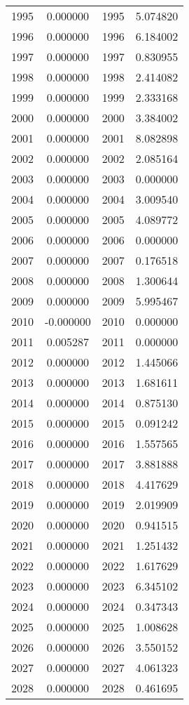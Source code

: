 \documentclass[12pt]{article}
\begin{document}
\begin{longtable}{@{}cccc@{}}
1995 & 0.000000 & 1995 & 5.074820 \\
1996 & 0.000000 & 1996 & 6.184002 \\
1997 & 0.000000 & 1997 & 0.830955 \\
1998 & 0.000000 & 1998 & 2.414082 \\
1999 & 0.000000 & 1999 & 2.333168 \\
2000 & 0.000000 & 2000 & 3.384002 \\
2001 & 0.000000 & 2001 & 8.082898 \\
2002 & 0.000000 & 2002 & 2.085164 \\
2003 & 0.000000 & 2003 & 0.000000 \\
2004 & 0.000000 & 2004 & 3.009540 \\
2005 & 0.000000 & 2005 & 4.089772 \\
2006 & 0.000000 & 2006 & 0.000000 \\
2007 & 0.000000 & 2007 & 0.176518 \\
2008 & 0.000000 & 2008 & 1.300644 \\
2009 & 0.000000 & 2009 & 5.995467 \\
2010 & -0.000000 & 2010 & 0.000000 \\
2011 & 0.005287 & 2011 & 0.000000 \\
2012 & 0.000000 & 2012 & 1.445066 \\
2013 & 0.000000 & 2013 & 1.681611 \\
2014 & 0.000000 & 2014 & 0.875130 \\
2015 & 0.000000 & 2015 & 0.091242 \\
2016 & 0.000000 & 2016 & 1.557565 \\
2017 & 0.000000 & 2017 & 3.881888 \\
2018 & 0.000000 & 2018 & 4.417629 \\
2019 & 0.000000 & 2019 & 2.019909 \\
2020 & 0.000000 & 2020 & 0.941515 \\
2021 & 0.000000 & 2021 & 1.251432 \\
2022 & 0.000000 & 2022 & 1.617629 \\
2023 & 0.000000 & 2023 & 6.345102 \\
2024 & 0.000000 & 2024 & 0.347343 \\
2025 & 0.000000 & 2025 & 1.008628 \\
2026 & 0.000000 & 2026 & 3.550152 \\
2027 & 0.000000 & 2027 & 4.061323 \\
2028 & 0.000000 & 2028 & 0.461695 \\

\end{longtable}
\end{document}
